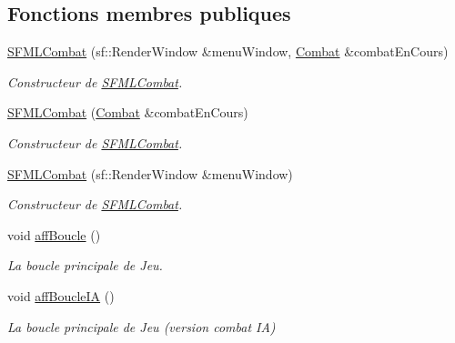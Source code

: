 \subsection*{Fonctions membres publiques}
\begin{DoxyCompactItemize}
\item 
\hyperlink{class_s_f_m_l_combat_a11ee4d8a8bc7f6cf85658af0f4b4b2a2}{S\+F\+M\+L\+Combat} (sf\+::\+Render\+Window \&menu\+Window, \hyperlink{class_combat}{Combat} \&combat\+En\+Cours)
\begin{DoxyCompactList}\small\item\em Constructeur de \hyperlink{class_s_f_m_l_combat}{S\+F\+M\+L\+Combat}. \end{DoxyCompactList}\item 
\hyperlink{class_s_f_m_l_combat_ac8e843e7ab09e8e8c18f9ddde4f17d6c}{S\+F\+M\+L\+Combat} (\hyperlink{class_combat}{Combat} \&combat\+En\+Cours)
\begin{DoxyCompactList}\small\item\em Constructeur de \hyperlink{class_s_f_m_l_combat}{S\+F\+M\+L\+Combat}. \end{DoxyCompactList}\item 
\hyperlink{class_s_f_m_l_combat_a28a895c7f9efdbe12cb47e3495500346}{S\+F\+M\+L\+Combat} (sf\+::\+Render\+Window \&menu\+Window)
\begin{DoxyCompactList}\small\item\em Constructeur de \hyperlink{class_s_f_m_l_combat}{S\+F\+M\+L\+Combat}. \end{DoxyCompactList}\item 
void \hyperlink{class_s_f_m_l_combat_a39155235e6275b4d63b9317b9561843e}{aff\+Boucle} ()
\begin{DoxyCompactList}\small\item\em La boucle principale de Jeu. \end{DoxyCompactList}\item 
void \hyperlink{class_s_f_m_l_combat_a116d70985530e3c46e5b60adc910a1fb}{aff\+Boucle\+IA} ()
\begin{DoxyCompactList}\small\item\em La boucle principale de Jeu (version combat IA) \end{DoxyCompactList}\end{DoxyCompactItemize}
